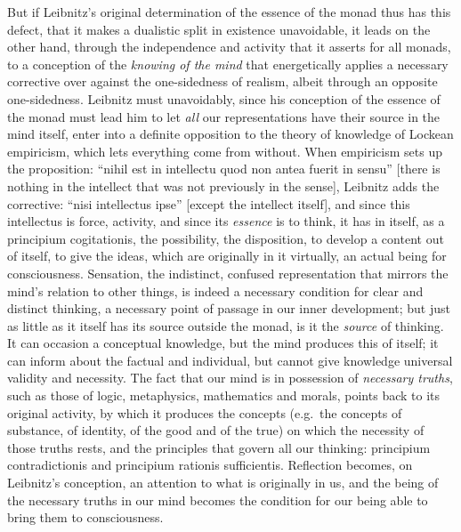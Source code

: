 But if Leibnitz's original determination of the essence of the monad
thus has this defect, that it makes a dualistic split in existence
unavoidable, it leads on the other hand, through the independence and
activity that it asserts for all monads, to a conception of the
\emph{knowing of the mind} that energetically applies a necessary
corrective over against the one-sidedness of realism, albeit through an
opposite one-sidedness. Leibnitz must unavoidably, since his conception
of the essence of the monad must lead him to let \emph{all} our
representations have their source in the mind itself, enter into a
definite opposition to the theory of knowledge of Lockean empiricism,
which lets everything
come from without. When empiricism sets up the proposition:
``nihil est in intellectu quod non antea fuerit in sensu'' [there is
nothing in the intellect that was not previously in the sense], Leibnitz
adds the corrective: ``nisi intellectus ipse'' [except the intellect
itself], and since this intellectus is force, activity, and since its
\emph{essence} is to think, it has in itself, as a principium
cogitationis, the possibility, the disposition, to develop a content
out of itself, to give the ideas, which are originally in it virtually,
an actual being for consciousness. Sensation, the indistinct, confused
representation that mirrors the mind's relation to other things, is
indeed a necessary condition for clear and distinct thinking, a
necessary point of passage in our inner development; but just as little
as it itself has its source outside the monad, is it the \emph{source}
of thinking. It can occasion a conceptual knowledge, but the mind
produces this of itself; it can inform about the factual and individual,
but cannot give knowledge universal validity and necessity. The fact
that our mind is in possession of \emph{necessary truths}, such as those
of logic, metaphysics, mathematics and morals, points back to its
original activity, by which it produces the concepts (e.g.\ the
concepts of substance, of identity, of the good and of the true) on
which the necessity of those truths rests, and the principles that
govern all our thinking: principium contradictionis and principium
rationis sufficientis. Reflection becomes, on Leibnitz's conception, an
attention to what is originally in us, and the being of the necessary
truths in our mind becomes the condition for our being able to bring
them to consciousness.

